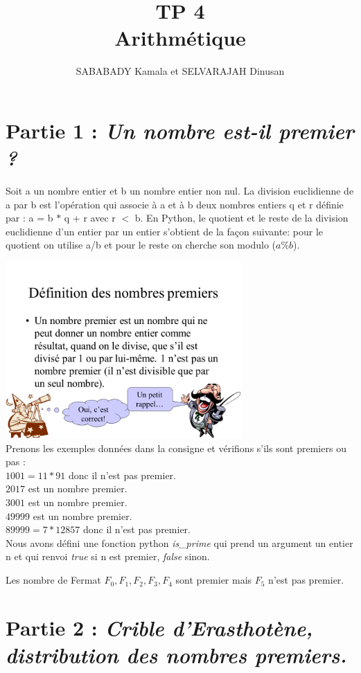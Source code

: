 \documentclass{article}
\title{TP 4 \\ Arithmétique}
\author{SABABADY Kamala et SELVARAJAH Dinusan}
\begin{document}
\maketitle

\section{{\color{red}Partie 1 :}  \textit{Un nombre est-il premier ?}}

Soit a un nombre entier et b un nombre entier non nul. La division euclidienne de a par b est l'opération qui associe à a et à b deux nombres entiers q et r définie par : a = b $*$ q + r avec r $<$ b.
En Python, le quotient et le reste de la division euclidienne d'un entier par un entier s'obtient de la façon suivante: pour le quotient on utilise a/b et pour le reste on cherche son modulo ($a\%b$).

\includegraphics[width=9cm]{10.jpg}
\\

Prenons les exemples données dans la consigne et vérifions s'ils sont premiers ou pas :\\
 $1001 = 11 * 91$ donc il n'est pas premier.\\
 $2017$ est un nombre premier.\\
 $3001$  est un nombre premier.\\
 $49999$ est un nombre premier.\\
 $89999 = 7*12857$ donc il n’est pas premier.\\

Nous avons défini une fonction python \textit{is\_prime} qui prend un argument un entier n et qui renvoi \textit{true} si n est premier, \textit{false} sinon.

Les nombre de Fermat $F_0,F_1,F_2,F_3,F_4$ sont premier mais $F_5$ n'est pas premier. 


\section{{\color{red}Partie 2 :} \textit{Crible d'Erasthotène, distribution des nombres premiers.}}
\end{document}
